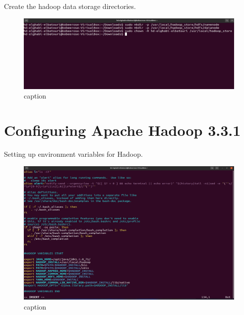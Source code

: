 \begin{spacing}{1.2}
\par Create the hadoop data storage directories.
\\
\begin{figure}[!htb] 
\begin{center} 
\includegraphics[width=1\linewidth]{Big_Data/Hadoop/Apache Hadoop Installation/Creating Storage repo.jpg} 
\end{center} 
\caption{caption} 
\end{figure} 
\FloatBarrier

\section{Configuring Apache Hadoop 3.3.1 }

\par Setting up environment variables for Hadoop.
\\
\begin{figure}[!htb] 
\begin{center} 
\includegraphics[width=1\linewidth]{Big_Data/Hadoop/Apache Hadoop Installation/Modifying .bashrc file.jpg} 
\end{center} 
\caption{caption} 
\end{figure} 
\FloatBarrier


\end{spacing}
